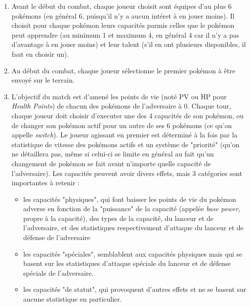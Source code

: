 \documentclass[a4paper,12pt]{article}
\begin{document}
\begin{enumerate}
    \item Avant le début du combat, chaque joueur choisit sont équipes d'au plus
    6 pokémons (en général 6, puisqu'il n'y a aucun intéret à en jouer moins).
    Il choisit pour chaque pokémon leurs capacités parmis celles que le pokémon
    peut apprendre (au minimum 1 et maximum 4, en général 4 car il n'y a pas
    d'avantage à en jouer moins) et leur talent (s'il en ont plusieurs
    disponibles, il faut en choisir un).
    \item Au début du combat, chaque joueur sélectionne le premier pokémon à
    être envoyé sur le terrain.
    \item L'objectif du match est d'amené les points de vie (noté PV ou HP pour
    \textit{Health Points}) de chacun des pokémons de l'adversaire à 0. Chaque
    tour, chaque joueur doit choisir d'executer une des 4 capacités de son
    pokémon, ou de changer son pokémon actif pour un autre de ses 6 pokémons (ce
    qu'on appelle \textit{switch}). Le joueur agissant en premier est déterminé
    à la fois par la statistique de vitesse des pokémons actifs et un système de
    "priorité" (qu'on ne détaillera pas, même si celui-ci se limite en général
    au fait qu'un changement de pokémon se fait avant n'importe quelle capacité
    de l'adversaire). Les capacités peuvent avoir divers effets, mais 3
    catégories sont importantes à retenir :
          \begin{itemize}
              \item les capacités "physiques", qui font baisser les points de
              vie du pokémon adverse en fonction de la "puissance" de la
              capacité (appelée \textit{base power}, propre à la capacité), des
              types de la capacité, du lanceur et de l'adversaire, et des
              statistiques respectivement d'attaque du lanceur et de défense de
              l'adversaire
              \item les capacités "spéciales", semblablent aux capacités
              physiques mais qui se basent sur les statistiques d'attaque
              spéciale du lanceur et de défense spéciale de l'adversaire.
              \item les capacités "de statut", qui provoquent d'autres effets et
              ne se basent sur aucune statistique en particulier.
          \end{itemize}
\end{enumerate}
\end{document}
